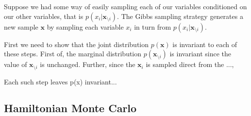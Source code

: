 Suppose we had some way of easily sampling each of our variables conditioned on our other variables, that is $p(x_i|\bm{x}_{\setminus i})$. 
The Gibbs sampling strategy generates a new sample $\bm{x}$ by sampling each variable $x_i$ in turn from $p(x_i|\bm{x}_{\setminus i})$.  

First we need to show that the joint distribution $p(\bm{x})$ is invariant to each of these steps. First of, the marginal distribution $p(\bm{x}_{\setminus i})$ is invariant since the value of $\bm{x}_{\setminus i}$ is unchanged. Further, since the $\bm{x}_i$ is sampled direct from the ..., 


Each such step leaves p(x) invariant...

\subsection{Hamiltonian Monte Carlo}

